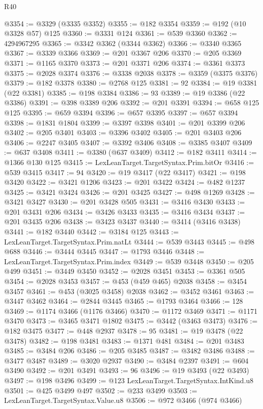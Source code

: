\begin{lexlean}{R40}
\begin{coremodule}
@3354 := @3329 (@3335 @3352)
@3355 := @182 @3354
@3359 := @192 (@10 @3328 @57) @125
@3360 := @3331 @124
@3361 := @539 @3360
@3362 := 4294967295
@3365 := @3342 @3362 (@3344 @3362)
@3366 := @3340 @3365
@3367 := @3339 @3366
@3369 := @201 @3367 @206
@3370 := @205 @3369
@3371 := @1165 @3370
@3373 := @201 @3371 @206
@3374 := @3361 @3373
@3375 := @2028 @3374
@3376 := @3338 @2038
@3378 := @3359 (@3375 @3376)
@3379 := @182 @3378
@3380 := @2768 @125
@3381 := 92
@3384 := @19 @3381 (@22 @3381)
@3385 := @198 @3384
@3386 := 93
@3389 := @19 @3386 (@22 @3386)
@3391 := @398 @3389 @206
@3392 := @201 @3391
@3394 := @658 @125 @125
@3395 := @659 @3394
@3396 := @657 @3395
@3397 := @657 @3394
@3398 := @1831 @1804
@3399 := @3397 @3398
@3401 := @201 @3399 @206
@3402 := @205 @3401
@3403 := @3396 @3402
@3405 := @201 @3403 @206
@3406 := @2247 @3405
@3407 := @3392 @3406
@3408 := @3385 @3407
@3409 := @637 @3408
@3411 := @3380 (@637 @3409)
@3412 := @182 @3411
@3414 := @1366 @130 @125
@3415 := LexLeanTarget.TargetSyntax.Prim.bitOr
@3416 := @539 @3415
@3417 := 94
@3420 := @19 @3417 (@22 @3417)
@3421 := @198 @3420
@3422 := @3421 @1206
@3423 := @201 @3422
@3424 := @482 @1237
@3425 := @3421 @3424
@3426 := @201 @3425
@3427 := @498 @1269
@3428 := @3421 @3427
@3430 := @201 @3428 @505
@3431 := @3416 @3430
@3433 := @201 @3431 @206
@3434 := @3426 @3433
@3435 := @3416 @3434
@3437 := @201 @3435 @206
@3438 := @3423 @3437
@3440 := @3414 (@3416 @3438)
@3441 := @182 @3440
@3442 := @3184 @125
@3443 := LexLeanTarget.TargetSyntax.Prim.natLt
@3444 := @539 @3443
@3445 := @498 @688
@3446 := @3444 @3445
@3447 := @1793 @3446
@3448 := LexLeanTarget.TargetSyntax.Prim.index
@3449 := @539 @3448
@3450 := @205 @499
@3451 := @3449 @3450
@3452 := @2028 @3451
@3453 := @3361 @505
@3454 := @2028 @3453
@3457 := @453 (@459 @465) @2038
@3458 := @3454 @3457
@3461 := @453 (@3025 @3458) @2038
@3462 := @3452 @3461
@3463 := @3447 @3462
@3464 := @2844 @3445
@3465 := @1793 @3464
@3466 := 128
@3469 := @1174 @3466 (@1176 @3466)
@3470 := @1172 @3469
@3471 := @1171 @3470
@3473 := @3465 @3471 @1802
@3475 := @3442 (@3463 @3473)
@3476 := @182 @3475
@3477 := @448 @2937
@3478 := 95
@3481 := @19 @3478 (@22 @3478)
@3482 := @198 @3481
@3483 := @1371 @481
@3484 := @201 @3483
@3485 := @3484 @206
@3486 := @205 @3485
@3487 := @3482 @3486
@3488 := @3477 @3487
@3489 := @3020 @2937
@3490 := @3484 @2397
@3491 := @604 @3490
@3492 := @201 @3491
@3493 := 96
@3496 := @19 @3493 (@22 @3493)
@3497 := @198 @3496
@3499 := @123 LexLeanTarget.TargetSyntax.IntKind.u8
@3501 := @425 @3499 @497
@3502 := @233 @3499
@3503 := LexLeanTarget.TargetSyntax.Value.u8
@3506 := @972 @3466 (@974 @3466)

\end{coremodule}
\end{lexlean}
